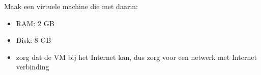 Maak een virtuele machine die met daarin:
\begin{itemize}
\item RAM: 2 GB
\item Disk: 8 GB
\item zorg dat de VM bij het Internet kan, dus zorg voor een netwerk met Internet verbinding
\end{itemize}

